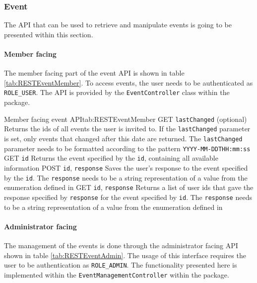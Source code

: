 \subsubsection{Event}

The \gls{API} that can be used to retrieve and manipulate events is going to be presented within this section. 

\paragraph{Member facing}
The member facing part of the event \gls{API} is shown in table \vref{tab:RESTEventMember}. To access events, the user needs to be authenticated as \texttt{ROLE\_USER}. The \gls{API} is provided by the \texttt{EventController} class within the  package.

\begin{RESTTable}{Member facing event API}{tab:RESTEventMember}
		{GET}
		{\texttt{lastChanged} (optional)}
		{Returns the ids of all events the user is invited to. If the \texttt{lastChanged} parameter is set, only events that changed after this date are returned. The \texttt{lastChanged} parameter needs to be formatted according to the pattern \texttt{YYYY-MM-DDTHH:mm:ss}}
		{GET}
		{\texttt{id}}
		{Returns the event specified by the \texttt{id}, containing all available information}
		{POST}
		{\texttt{id}, \texttt{response}}
		{Saves the user's response to the event specified by the \texttt{id}. The \texttt{response} needs to be a string representation of a value from the enumeration defined in }
		{GET}
		{\texttt{id}, \texttt{response}}
		{Returns a list of user ids that gave the response specified by \texttt{response} for the event specified by \texttt{id}. The \texttt{response} needs to be a string representation of a value from the enumeration defined in }
\end{RESTTable}

\paragraph{Administrator facing}
The management of the events is done through the administrator facing \gls{API} shown in table \vref{tab:RESTEventAdmin}. The usage of this interface requires the user to be authentication as \texttt{ROLE\_ADMIN}. The functionality presented here is implemented within the \texttt{EventManagementController} within the  package.

